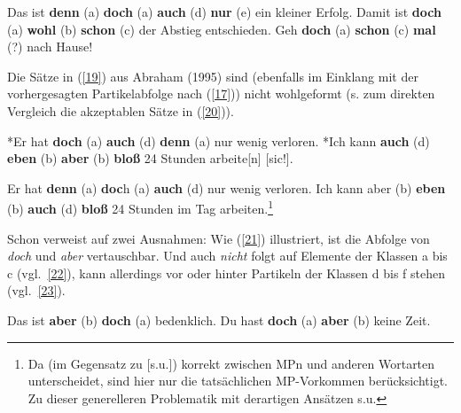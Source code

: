 \begin{exe}
	\ex\label{18} 
		\begin{xlist}	
			\ex\label{18a} Das ist \textbf{denn} (a) \textbf{doch} (a) \textbf{auch} (d) \textbf{nur} (e) ein kleiner Erfolg.
			\ex\label{18b} Damit ist \textbf{doch} (a) \textbf{wohl} (b) \textbf{schon} (c) der Abstieg entschieden.
			\ex\label{18c} Geh \textbf{doch} (a) \textbf{schon} (c) \textbf{mal} (?) nach Hause!
			\hfill\hbox{\citet[42]{Helbig1981}}
		\end{xlist}
\end{exe}
Die Sätze in (\ref{19}) aus Abraham (1995) sind (ebenfalls im Einklang mit der vorhergesagten Partikelabfolge nach (\ref{17})) nicht wohlgeformt (s. zum direkten Vergleich die akzeptablen Sätze in (\ref{20})).

\begin{exe}
	\ex\label{19} 
		\begin{xlist}	
			\ex\label{19a} *Er hat \textbf{doch} (a) \textbf{auch} (d) \textbf{denn} (a) nur wenig verloren.
			\ex\label{19b} *Ich kann \textbf{auch} (d) \textbf{eben} (b) \textbf{aber} (b) \textbf{bloß} 24 Stunden arbeite[n] 					[sic!].
		\end{xlist}
\end{exe}

\begin{exe}
	\ex\label{20} 
		\begin{xlist}	
			\ex\label{20a} Er hat \textbf{denn} (a) \textbf{doc}h (a) \textbf{auch} (d) nur wenig verloren.
			\ex\label{20b} Ich kann aber (b) \textbf{eben} (b) \textbf{auch} (d) \textbf{bloß} 24 Stunden im Tag arbeiten.\footnote{Da \citet{Abraham1995} (im Gegensatz zu \citealt{Engel1968} [s.u.]) korrekt zwischen MPn und anderen Wortarten unterscheidet, sind hier nur die tatsächlichen MP-Vorkommen berücksichtigt. Zu dieser generelleren Problematik mit derartigen Ansätzen s.u.}	
		\end{xlist}
		\hfill\hbox{\citet[248/249]{Abraham1995}}	
\end{exe}
Schon \citet{Engel1968} verweist auf zwei Ausnahmen: Wie (\ref{21}) illustriert, ist die Abfolge von \textit{doch} und \textit{aber} vertauschbar. Und auch \textit{nicht} folgt auf Elemente der Klassen a bis c (vgl.\ \ref{22}), kann allerdings vor oder hinter Partikeln der Klassen d bis f stehen (vgl.\ \ref{23}).

\begin{exe}
	\ex\label{21} 
		\begin{xlist}	
			\ex\label{21a} Das ist \textbf{aber} (b) \textbf{doch} (a) bedenklich.
			\ex\label{21b} Du hast \textbf{doch} (a) \textbf{aber} (b) keine Zeit.
		\end{xlist}
\end{exe}

